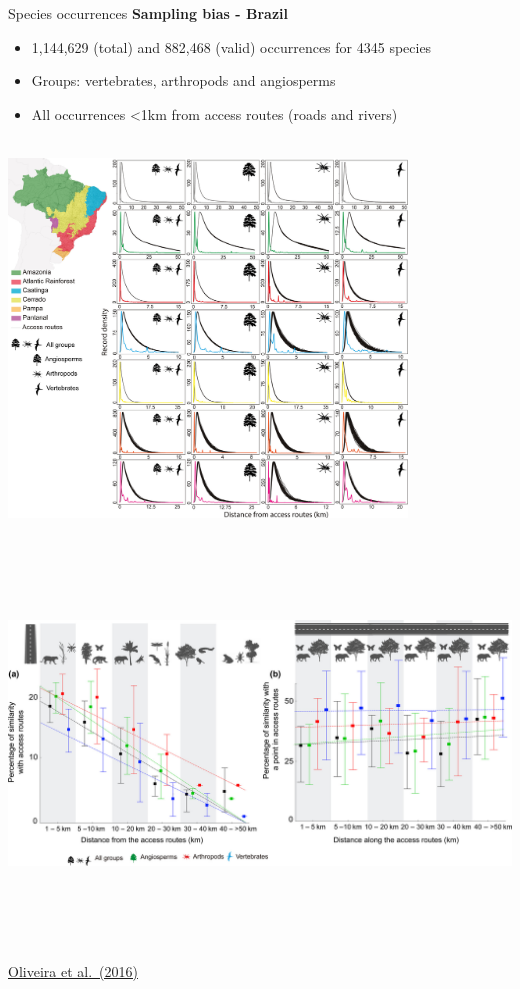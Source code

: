 \documentclass[
  ignorenonframetext,
]{beamer}
\providecommand{\tightlist}{%
  \setlength{\itemsep}{0pt}\setlength{\parskip}{0pt}}\usepackage{longtable,booktabs,array}
\begin{document}
\begin{frame}{Species occurrences}
\label{species-occurrences-5}
\textbf{Sampling bias - Brazil}

\begin{itemize}
\tightlist
\item
  1,144,629 (total) and 882,468 (valid) occurrences for 4345 species
\item
  Groups: vertebrates, arthropods and angiosperms
\item
  All occurrences \textless1km from access routes (roads and rivers)
\end{itemize}

\includegraphics[width=4.16667in,height=4.16667in]{img/sdm_occ_vies_brasil01.jpg}
\includegraphics[width=7.8125in,height=4.16667in]{img/sdm_occ_vies_brasil02.jpg}

\href{https://doi.org/10.1111/ddi.12489}{Oliveira et al.~(2016)}
\end{frame}
\end{document}
